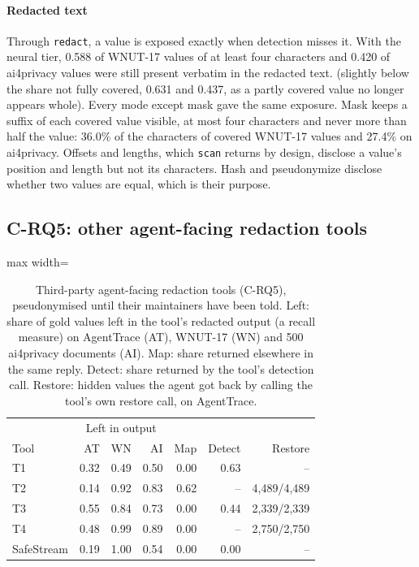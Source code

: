 \documentclass[conference]{IEEEtran}
\begin{document}
\paragraph{Redacted text} Through \texttt{redact}, a value is exposed exactly when detection misses it. With the neural tier, 0.588 of WNUT-17 values of at least four characters and 0.420 of ai4privacy values were still present verbatim in the redacted text. (slightly below the share not fully covered, 0.631 and 0.437, as a partly covered value no longer appears whole). Every mode except mask gave the same exposure. Mask keeps a suffix of each covered value visible, at most four characters and never more than half the value: 36.0\% of the characters of covered WNUT-17 values and 27.4\% on ai4privacy. Offsets and lengths, which \texttt{scan} returns by design, disclose a value's position and length but not its characters. Hash and pseudonymize disclose whether two values are equal, which is their purpose.

\subsection{C-RQ5: other agent-facing redaction tools}\label{sec:thirdparty}

\begin{table}[t]
\caption{Third-party agent-facing redaction tools (C-RQ5), pseudonymised until their maintainers have been told. Left: share of gold values left in the tool's redacted output (a recall measure) on AgentTrace (AT), WNUT-17 (WN) and 500 ai4privacy documents (AI). Map: share returned elsewhere in the same reply. Detect: share returned by the tool's detection call. Restore: hidden values the agent got back by calling the tool's own restore call, on AgentTrace.}\label{tab:thirdparty}
\centering\footnotesize\setlength{\tabcolsep}{3pt}
\begin{adjustbox}{max width=\columnwidth}\begin{tabular}{@{}l rrr rr r@{}}
\toprule
 & \multicolumn{3}{c}{Left in output} & & & \\
Tool & AT & WN & AI & Map & Detect & Restore \\
\midrule
T1 & 0.32 & 0.49 & 0.50 & 0.00 & 0.63 & -- \\
T2 & 0.14 & 0.92 & 0.83 & 0.62 & -- & 4,489/4,489 \\
T3 & 0.55 & 0.84 & 0.73 & 0.00 & 0.44 & 2,339/2,339 \\
T4 & 0.48 & 0.99 & 0.89 & 0.00 & -- & 2,750/2,750 \\
SafeStream & 0.19 & 1.00 & 0.54 & 0.00 & 0.00 & -- \\
\bottomrule
\end{tabular}\end{adjustbox}
\end{table}
\end{document}
